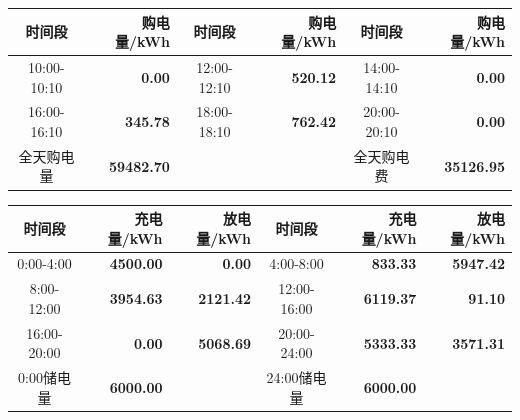 {\setlength{\tabcolsep}{2pt}
\begin{center}
\begin{tabular}{|c|r|c|r|c|r|}
\hline
时间段 & 购电量/kWh & 时间段 & 购电量/kWh & 时间段 & 购电量/kWh \\
\hline10:00-10:10 & \textbf{0.00} & 12:00-12:10 & \textbf{520.12} & 14:00-14:10 & \textbf{0.00} \\
\hline16:00-16:10 & \textbf{345.78} & 18:00-18:10 & \textbf{762.42} & 20:00-20:10 & \textbf{0.00} \\
\hline
全天购电量 & \textbf{59482.70} & & & 全天购电费 & \textbf{35126.95} \\
\hline
\end{tabular}
\par{}

\vspace{0.15\baselineskip}
\begin{tabular}{|c|r|r|c|r|r|}
\hline
时间段 & 充电量/kWh & 放电量/kWh & 时间段 & 充电量/kWh & 放电量/kWh \\
\hline0:00-4:00 & \textbf{4500.00} & \textbf{0.00} & 4:00-8:00 & \textbf{833.33} & \textbf{5947.42} \\
\hline8:00-12:00 & \textbf{3954.63} & \textbf{2121.42} & 12:00-16:00 & \textbf{6119.37} & \textbf{91.10} \\
\hline16:00-20:00 & \textbf{0.00} & \textbf{5068.69} & 20:00-24:00 & \textbf{5333.33} & \textbf{3571.31} \\
\hline0:00储电量 & \textbf{6000.00} & & 24:00储电量 & \textbf{6000.00} & \\
\hline
\end{tabular}
\par{}

\end{center}
}
